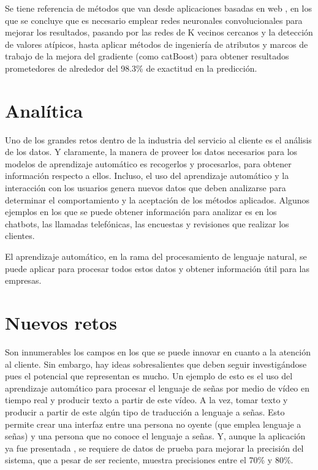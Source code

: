 \documentclass[conference]{IEEEtran}
\begin{document}
Se tiene referencia de métodos que van desde aplicaciones basadas en web \cite{9182954}, en los que se concluye que es necesario emplear redes neuronales convolucionales para mejorar los resultados, pasando por las redes de K vecinos cercanos \cite{7972424} y la detección de valores atípicos, hasta aplicar métodos de ingeniería de atributos y marcos de trabajo de la mejora del gradiente \cite{9342475} (como catBoost) para obtener resultados prometedores de alrededor del 98.3\% de exactitud en la predicción.

\section{Analítica}

Uno de los grandes retos dentro de la industria del servicio al cliente es el análisis de los datos. Y claramente, la manera de proveer los datos necesarios para los modelos de aprendizaje automático es recogerlos y procesarlos, para obtener información respecto a ellos. Incluso, el uso del aprendizaje automático y la interacción con los usuarios genera nuevos datos que deben analizarse para determinar el comportamiento y la aceptación de los métodos aplicados. Algunos ejemplos en los que se puede obtener información para analizar es en los chatbots, las llamadas telefónicas, las encuestas y revisiones que realizar los clientes.

El aprendizaje automático, en la rama del procesamiento de lenguaje natural, se puede aplicar para procesar todos estos datos y obtener información útil para las empresas.

\section{Nuevos retos}

Son innumerables los campos en los que se puede innovar en cuanto a la atención al cliente. Sin embargo, hay ideas sobresalientes que deben seguir investigándose pues el potencial que representan es mucho. Un ejemplo de esto es el uso del aprendizaje automático para procesar el lenguaje de señas por medio de vídeo en tiempo real y producir texto a partir de este vídeo. A la vez, tomar texto y producir a partir de este algún tipo de traducción a lenguaje a señas. Esto permite crear una interfaz entre una persona no oyente (que emplea lenguaje a señas) y una persona que no conoce el lenguaje a señas. Y, aunque la aplicación ya fue presentada \cite{lingvo}, se requiere de datos de prueba para mejorar la precisión del sistema, que a pesar de ser reciente, muestra precisiones entre el 70\% y 80\%.
\end{document}
